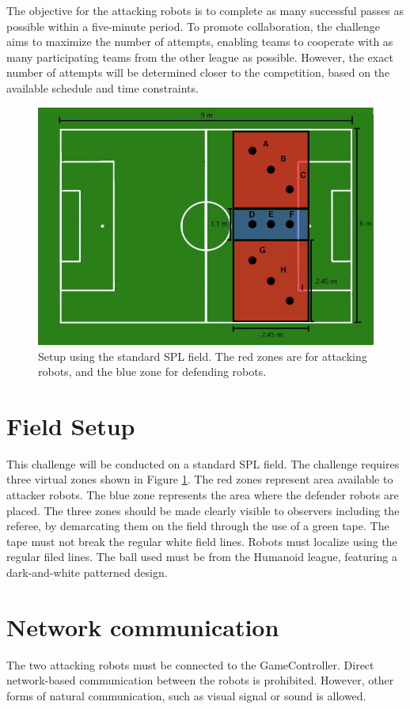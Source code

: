 \documentclass[12pt]{article}
\begin{document}
The objective for the attacking robots is to complete as many successful passes as possible within a five-minute period.
To promote collaboration, the challenge aims to maximize the number of attempts, enabling teams to cooperate with as many participating teams from the other league as possible.
However, the exact number of attempts will be determined closer to the competition, based on the available schedule and time constraints.
\begin{figure}[ht]
\includegraphics[width=0.95\linewidth]{../figs/ch_2_full.jpg}
\caption{Setup using the standard SPL field. The red zones are for attacking robots, and the blue zone for defending robots. }
\label{ch2:zone96}
\centering
\end{figure}

\section{Field Setup}
This challenge will be conducted on a standard SPL field.
The challenge requires three virtual zones shown in Figure \ref{ch2:zone96}.
The red zones represent area available to attacker robots. The blue zone represents the area where the defender robots are placed.
The three zones should be made clearly visible to observers including the referee, by demarcating them on the field through the use of a green tape. The tape must not break the regular white field lines.
Robots must localize using the regular filed lines.
The ball used must be from the Humanoid league, featuring a dark-and-white patterned design.

\section{Network communication}
The two attacking robots must be connected to the GameController.
Direct network-based communication between the robots is prohibited.
However, other forms of natural communication, such as visual signal or sound is allowed.
\end{document}

